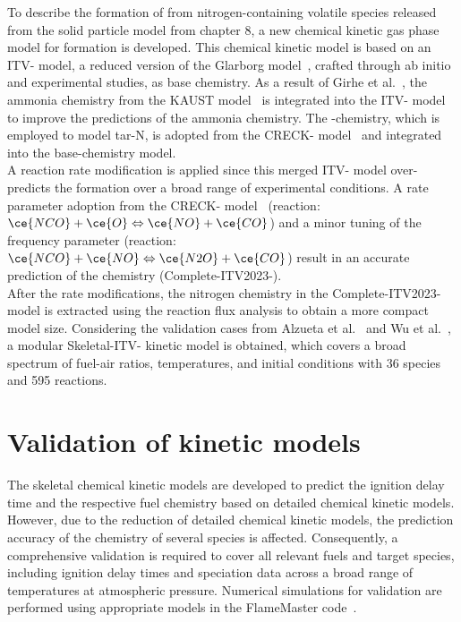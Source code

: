 \begin{refsection}
To describe the formation of  from nitrogen-containing volatile species released from the solid particle model from chapter 8, a new chemical kinetic gas phase model for  formation is developed. This chemical kinetic model is based on an ITV- model, a reduced version of the Glarborg model~\cite{Glarborg2018}, crafted through ab initio and experimental studies, as base chemistry. As a result of Girhe et al.~\cite{Girhe2024}, the ammonia chemistry from the KAUST model~\cite{Zhang2023} is integrated into the ITV- model to improve the predictions of the ammonia chemistry. The -chemistry, which is employed to model tar-N, is adopted from the CRECK- model~\cite{Shamooni2021} and integrated into the base-chemistry model.
\\
A reaction rate modification is applied since this merged ITV- model over-predicts the  formation over a broad range of experimental conditions. A rate parameter adoption from the CRECK- model~\cite{Shamooni2021} (reaction: $\ce{NCO}+\ce{O} \Leftrightarrow \ce{NO}+\ce{CO}$) and a minor tuning of the frequency parameter (reaction: $\ce{NCO}+\ce{NO} \Leftrightarrow \ce{N2O}+\ce{CO}$) result in an accurate prediction of the  chemistry (Complete-ITV2023-).
\\
After the rate modifications, the nitrogen chemistry in the Complete-ITV2023- model is extracted using the reaction flux analysis to obtain a more compact model size. Considering the validation cases from Alzueta et al.~\cite{Alzueta2002} and Wu et al.~\cite{Wu2019, Wu2022}, a modular Skeletal-ITV- kinetic model is obtained, which covers a broad spectrum of fuel-air ratios, temperatures, and initial conditions with 36 species and 595 reactions.

\newpage
\section{Validation of kinetic models}

The skeletal chemical kinetic models are developed to predict the ignition delay time and the respective fuel chemistry based on detailed chemical kinetic models. However, due to the reduction of detailed chemical kinetic models, the prediction accuracy of the chemistry of several species is affected. Consequently, a comprehensive validation is required to cover all relevant fuels and target species, including ignition delay times and speciation data across a broad range of temperatures at atmospheric pressure. Numerical simulations for validation are performed using appropriate models in the FlameMaster code~\cite{Pitsch1998b}.



\end{refsection}
